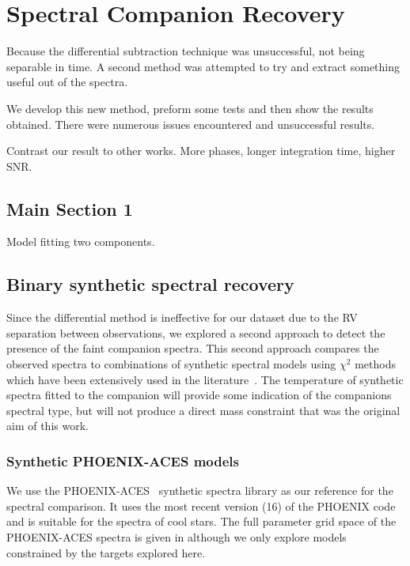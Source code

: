 
\chapter{Spectral Companion Recovery}  %

\label{cha:model_comparison}


Because the differential subtraction technique was unsuccessful, not being separable in time. A second method was attempted to try and extract something useful out of the spectra.

We develop this new method, preform some tests and then show the results obtained. There were numerous issues encountered and unsuccessful results.

Contrast our result to other works.  More phases, longer integration time, higher {SNR}.




\section{Main Section 1}
Model fitting two components.




\section{Binary synthetic spectral recovery}
\label{subsec:companion_recovery}
Since the differential method is ineffective for our dataset due to the {RV} separation between observations, we explored a second approach to detect the presence of the faint companion spectra. This second approach compares the observed spectra to combinations of synthetic spectral models using \(\chi^{2}\) methods which have been extensively used in the literature~\citep[e.g.,][]{astudillo-defru_harps_2015, passegger_fundamental_2016, zechmeister_spectrum_2018, nemravova_xtauri_2016}. {\rd{} The temperature of synthetic spectra fitted to  the companion will provide some indication of the companions spectral type, but will not produce a direct mass constraint that was the original aim of this work.}

\subsection{Synthetic {PHOENIX-ACES} models}
\label{subsec:spec_models}
We use the {PHOENIX-ACES}~\citep{husser_new_2013} synthetic spectra library as our reference for the spectral comparison. It uses the most recent version (16) of the PHOENIX code and is suitable for the spectra of cool stars. The full parameter grid space of the {PHOENIX-ACES} spectra is given in  although we only explore models constrained by the targets explored here.

